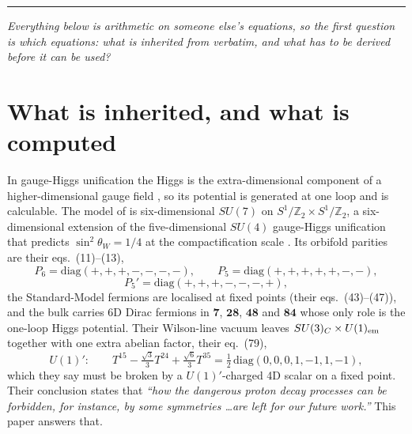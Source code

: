 \documentclass[11pt,a4paper]{article}
\newcommand{\ZZ}{\mathbb{Z}}
\newcommand{\su}[1]{SU(#1)}
\newcommand{\rep}[1]{\mathbf{#1}}
\newcommand{\bridge}[1]{\par\medskip\noindent
  \textcolor{hdrblue!45}{\rule{2.2cm}{0.6pt}}\;\;\parbox[t]{0.84\textwidth}{\small\itshape
  \textcolor{hdrblue!85}{#1}}\par\medskip}
\begin{document}
\bridge{Everything below is arithmetic on someone else's equations, so the first question is which
equations: what is inherited from \cite{KM25} verbatim, and what has to be derived before it can be
used?}

\section{What is inherited, and what is computed}\label{sec:setting}

In gauge-Higgs unification the Higgs is the extra-dimensional component of a higher-dimensional
gauge field \cite{Manton,Hosotani}, so its potential is generated at one loop and is calculable. The
model of \cite{KM25} is six-dimensional $\su7$ on $S^1/\ZZ_2\times S^1/\ZZ_2$, a six-dimensional
extension of the five-dimensional $\su4$ gauge-Higgs unification that predicts
$\sin^2\theta_W=1/4$ at the compactification scale \cite{AHMN}. Its orbifold parities are their
eqs.~(11)--(13),
\[
P_6=\mathrm{diag}(+,+,+,-,-,-,-),\qquad
P_5=\mathrm{diag}(+,+,+,+,+,-,-),
\]
\[
P_5'=\mathrm{diag}(+,+,+,-,-,-,+),
\]
the Standard-Model fermions are localised at fixed points (their eqs.~(43)--(47)), and the bulk
carries 6D Dirac fermions in $\rep7$, $\rep{28}$, $\rep{48}$ and $\rep{84}$ whose only role is the
one-loop Higgs potential. Their Wilson-line vacuum leaves $\su3_C\times U(1)_{\rm em}$ together with
one extra abelian factor, their eq.~(79),
\begin{equation}\label{eq:u1p}
U(1)':\qquad T^{15}-\tfrac{\sqrt3}{3}T^{24}+\tfrac{\sqrt6}{3}T^{35}
=\tfrac12\,\mathrm{diag}(0,0,0,1,-1,1,-1),
\end{equation}
which they say must be broken by a $U(1)'$-charged 4D scalar on a fixed point. Their conclusion
states that \emph{``how the dangerous proton decay processes can be forbidden, for instance, by some
symmetries \dots are left for our future work.''} This paper answers that.
\end{document}
